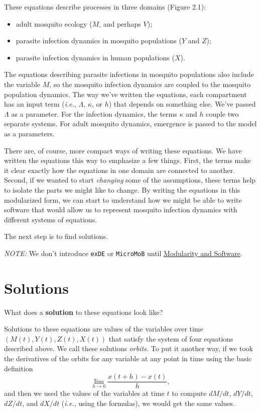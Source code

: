\documentclass[
]{book}
\begin{document}
These equations describe processes in three domains (Figure 2.1):

\begin{itemize}
\item
  adult mosquito ecology (\(M\), and perhaps \(V\));
\item
  parasite infection dynamics in mosquito populations (\(Y\) and \(Z\));
\item
  parasite infection dynamics in human populations (\(X\)).
\end{itemize}

The equations describing parasite infections in mosquito populations also include the variable \(M\), so the mosquito infection dynamics are coupled to the mosquito population dynamics. The way we've written the equations, each compartment has an input term (\emph{i.e.}, \(\Lambda\), \(\kappa\), or \(h\)) that depends on something else. We've passed \(\Lambda\) as a parameter. For the infection dynamics, the terms \(\kappa\) and \(h\) couple two separate systems. For adult mosquito dynamics, emergence is passed to the model as a parameters.

There are, of course, more compact ways of writing these equations. We have written the equations this way to emphasize a few things. First, the terms make it clear exactly how the equations in one domain are connected to another. Second, if we wanted to start \emph{changing} some of the assumptions, these terms help to isolate the parts we might like to change. By writing the equations in this modularized form, we can start to understand how we might be able to write software that would allow us to represent mosquito infection dynamics with different systems of equations.

The next step is to find solutions.

\emph{NOTE:} We don't introduce \texttt{exDE} or \texttt{MicroMoB} until \protect\hyperlink{modularity-and-software}{Modularity and Software}.

\hypertarget{solutions}{%
\section{Solutions}\label{solutions}}

What does a \textbf{solution} to these equations look like?

Solutions to these equations are values of the variables over time \(\left( M(t), Y(t), Z(t), X(t) \right)\) that satisfy the system of four equations described above. We call these solutions \emph{orbits.} To put it another way, if we took the derivatives of the orbits for any variable at any point in time using the basic definition \[\lim_{h\rightarrow 0} \frac{x(t+h)-x(t)}{h},\] and then we used the values of the variables at time \(t\) to compute \(dM/dt\), \(dY/dt\), \(dZ/dt\), and \(dX/dt\) (\emph{i.e.}, using the formulas), we would get the same values.
\end{document}
